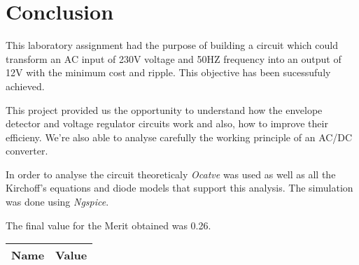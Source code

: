 \section{Conclusion}
\label{sec:conclusion}
This laboratory assignment had the purpose of building a circuit which could transform an AC input of 230V voltage and 50HZ frequency into an output of 12V with the minimum cost and ripple. This objective has been sucessufuly achieved.\par 
This project provided us the opportunity to understand how the envelope detector and voltage regulator circuits work and also, how to improve their efficieny. We're also able to analyse carefully the working principle of an AC/DC converter. \par
In order to analyse the circuit theoreticaly \textit{Ocatve} was used as well as all the Kirchoff's equations and diode models that support this analysis. 
The simulation was done using \textit{Ngspice}. \par
The final value for the Merit obtained was 0.26.


\begin{center}
  \begin{tabular}{ | c | c | }
    \hline    
    {\bf Name} & {\bf Value} \\ \hline
    
    \hline
  \end{tabular}
\end{center}


